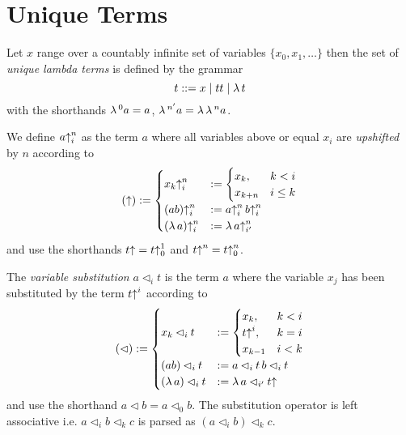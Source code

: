 \section{Unique Terms}

\begin{definition}
  Let $x$ range over a countably infinite set of variables
  $\{x_0, x_1, \ldots\}$ then the set of \emph{unique lambda terms} is defined by the
  grammar
  $$t ::= x \mid t t \mid \lambda\, t$$
with the shorthands $\lambda\,^0 a = a$, $\lambda\,^{n'} a = \lambda\, \lambda\,^n a$.
\end{definition}


\begin{definition} We define $a{\uparrow}_i^n$ as the term $a$ where all
  variables above or equal $x_i$ are \emph{upshifted} by $n$ according to
$$ ({\uparrow}) :=
        \begin{cases}
          x_k{\uparrow}^n_i &:=
          \begin{cases}
            x_k, & k < i \\
            x_{k+n} & i \le k
          \end{cases}
          \\
          (a b){\uparrow}^n_i &:= a{\uparrow}^n_i \, b{\uparrow}^n_i
          \\
          (\lambda\, a) {\uparrow}^n_i &:= \lambda\, a {\uparrow}^n_{i'}
        \end{cases}
$$
and use the shorthands $t{\uparrow} = t{\uparrow}_0^1$
and
$t{\uparrow}^n = t{\uparrow}^n_0$.
\end{definition}




\begin{definition}
  The \emph{variable substitution} $a\lhd_i t$ is the term $a$ where the
  variable $x_j$ has been substituted by the term $t{\uparrow}^i$ according to
$$ (\lhd) :=
        \begin{cases}
          x_k\lhd_i t &:=
          \begin{cases}
            x_k, & k < i
            \\
            t{\uparrow}^i, & k = i
            \\
            x_{k-1} & i < k
          \end{cases}
          \\
          (a b)\lhd_i t &:= a\lhd_i t\, b\lhd_i t
          \\
          (\lambda\, a) \lhd_i t&:= \lambda\, a \lhd_{i'} t{\uparrow}
        \end{cases}
$$
and use the shorthand $a\lhd b = a\lhd_0 b$. The substitution operator is left
associative i.e. $a \lhd_i b \lhd_k c$ is parsed as $(a \lhd_i b) \lhd_k c$.
\end{definition}


